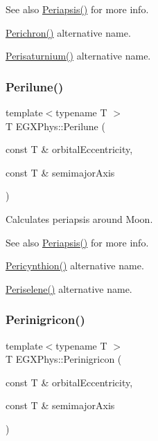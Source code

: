 \begin{DoxySeeAlso}{See also}
\hyperlink{group___periapsis_ga4414ac75539371ec874a3d25cad6c9fe}{Periapsis()} for more info. 

\hyperlink{group___periapsis_ga12b5e99aa2e3e7031ef6ce93060cf516}{Perichron()} alternative name. 

\hyperlink{group___periapsis_ga60a50d09d29ebe47cbbfc125c2ea42bf}{Perisaturnium()} alternative name. 
\end{DoxySeeAlso}
\mbox{\label{group___periapsis_ga2cc7ab05e18d32c94d8d74972e032793}} 
\subsubsection{\texorpdfstring{Perilune()}{Perilune()}}
{\footnotesize\ttfamily template$<$typename T $>$ \\
T E\+G\+X\+Phys\+::\+Perilune (\begin{DoxyParamCaption}\item[{const T \&}]{orbital\+Eccentricity,  }\item[{const T \&}]{semimajor\+Axis }\end{DoxyParamCaption})}



Calculates periapsis around Moon. 

\begin{DoxySeeAlso}{See also}
\hyperlink{group___periapsis_ga4414ac75539371ec874a3d25cad6c9fe}{Periapsis()} for more info. 

\hyperlink{group___periapsis_gaeeba153b188cd06cbd233eaef12f0a6a}{Pericynthion()} alternative name. 

\hyperlink{group___periapsis_ga255874374dde571531e443cdbef9ef0c}{Periselene()} alternative name. 
\end{DoxySeeAlso}
\mbox{\label{group___periapsis_ga99d86af90179994e17158b082c502fd4}} 
\subsubsection{\texorpdfstring{Perinigricon()}{Perinigricon()}}
{\footnotesize\ttfamily template$<$typename T $>$ \\
T E\+G\+X\+Phys\+::\+Perinigricon (\begin{DoxyParamCaption}\item[{const T \&}]{orbital\+Eccentricity,  }\item[{const T \&}]{semimajor\+Axis }\end{DoxyParamCaption})}



